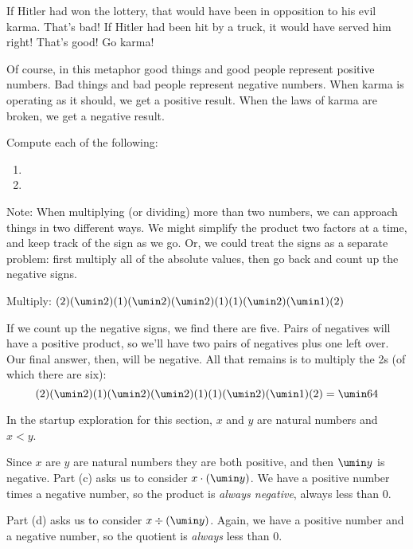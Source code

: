If Hitler had won the lottery, that would have been in opposition to his evil karma. That's bad! If Hitler had been hit by a truck, it would have served him right! That's good! Go karma!

Of course, in this metaphor good things and good people represent positive numbers. Bad things and bad people represent negative numbers. When karma is operating as it should, we get a positive result. When the laws of karma are broken, we get a negative result.

\begin{boxedex}
Compute each of the following:

\begin{enumerate}[itemsep=10pt]
\item {}

\item {}
\end{enumerate}
\end{boxedex}

Note: When multiplying (or dividing) more than two numbers, we can approach things in two different ways. We might simplify the product two factors at a time, and keep track of the sign as we go. Or, we could treat the signs as a separate problem: first multiply all of the absolute values, then go back and count up the negative signs. %

\begin{boxedex}
Multiply: $(2)(\umin2)(1)(\umin2)(\umin2)(1)(1)(\umin2)(\umin1)(2)$

\exsoln{} If we count up the negative signs, we find there are five. Pairs of negatives will have a positive product, so we'll have two pairs of negatives plus one left over. Our final answer, then, will be negative. All that remains is to multiply the 2s (of which there are six): \[(2)(\umin2)(1)(\umin2)(\umin2)(1)(1)(\umin2)(\umin1)(2) = \umin64\]
\end{boxedex}

\begin{boxedex}
In the startup exploration for this section, $x$ and $y$ are natural numbers and $x<y$.

Since $x$ are $y$ are natural numbers they are both positive, and then $\umin y$ is negative. Part (c) asks us to consider $x\cdot(\umin y)$. We have a positive number times a negative number, so the product is \textit{always negative}, always less than 0.

Part (d) asks us to consider $x\div(\umin y)$. Again, we have a positive number and a negative number, so the quotient is \textit{always} less than 0.
\end{boxedex}


